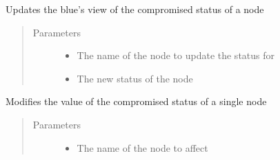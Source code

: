 \documentclass[letterpaper,10pt,english]{sphinxmanual}
\begin{document}
\begin{fulllineitems}
\begin{fulllineitems}
\label{\detokenize{source/yawning_titan.envs.generic.core:yawning_titan.envs.generic.core.network_interface.NetworkInterface.update_single_node_blue_view}}
\sphinxAtStartPar
Updates the blue’s view of the compromised status of a node
\begin{quote}\begin{description}
\item[{Parameters}] \leavevmode\begin{itemize}
\item {}
\sphinxAtStartPar
{} \textendash{} The name of the node to update the status for

\item {}
\sphinxAtStartPar
{} \textendash{} The new status of the node

\end{itemize}

\end{description}\end{quote}

\end{fulllineitems}


\begin{fulllineitems}
\label{\detokenize{source/yawning_titan.envs.generic.core:yawning_titan.envs.generic.core.network_interface.NetworkInterface.update_single_node_compromised_status}}
\sphinxAtStartPar
Modifies the value of the compromised status of a single node
\begin{quote}\begin{description}
\item[{Parameters}] \leavevmode\begin{itemize}
\item {}
\sphinxAtStartPar
{} \textendash{} The name of the node to affect


\end{itemize}
\end{description}
\end{quote}
\end{fulllineitems}
\end{fulllineitems}
\end{document}
